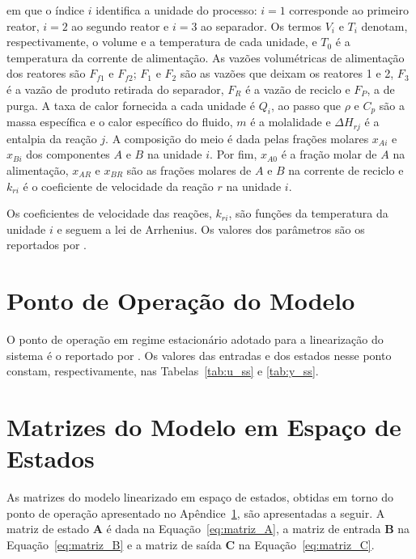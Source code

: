 em que o índice $i$ identifica a unidade do processo: $i=1$ corresponde ao primeiro reator, $i=2$ ao segundo reator e $i=3$ ao separador.
Os termos $V_i$ e $T_i$ denotam, respectivamente, o volume e a temperatura de cada unidade, e $T_0$ é a temperatura da corrente de alimentação.
As vazões volumétricas de alimentação dos reatores são $F_{f1}$ e $F_{f2}$; $F_1$ e $F_2$ são as vazões que deixam os reatores 1 e 2, $F_3$ é a vazão de produto retirada do separador, $F_R$ é a vazão de reciclo e $F_P$, a de purga.
A taxa de calor fornecida a cada unidade é $Q_i$, ao passo que $\rho$ e $C_p$ são a massa específica e o calor específico do fluido, $m$ é a molalidade e $\Delta H_{rj}$ é a entalpia da reação $j$.
A composição do meio é dada pelas frações molares $x_{Ai}$ e $x_{Bi}$ dos componentes $A$ e $B$ na unidade $i$.
Por fim, $x_{A0}$ é a fração molar de $A$ na alimentação, $x_{AR}$ e $x_{BR}$ são as frações molares de $A$ e $B$ na corrente de reciclo e $k_{ri}$ é o coeficiente de velocidade da reação $r$ na unidade $i$.

Os coeficientes de velocidade das reações, $k_{ri}$, são funções da temperatura da unidade $i$ e seguem a lei de Arrhenius.
Os valores dos parâmetros são os reportados por \textcite{pourkargar_2017}.

\clearpage

\section{Ponto de Operação do Modelo}
\label{sec:apendice_ponto_operacao}

O ponto de operação em regime estacionário adotado para a linearização do sistema é o reportado por \textcite{pourkargar_2017}.
Os valores das entradas e dos estados nesse ponto constam, respectivamente, nas Tabelas~\ref{tab:u_ss} e \ref{tab:y_ss}.





\clearpage

\section{Matrizes do Modelo em Espaço de Estados}
\label{sec:apendice_ABC}

As matrizes do modelo linearizado em espaço de estados, obtidas em torno do ponto de operação apresentado no Apêndice~\ref{sec:apendice_ponto_operacao}, são apresentadas a seguir.
A matriz de estado $\mathbf{A}$ é dada na Equação~\ref{eq:matriz_A}, a matriz de entrada $\mathbf{B}$ na Equação~\ref{eq:matriz_B} e a matriz de saída $\mathbf{C}$ na Equação~\ref{eq:matriz_C}.






